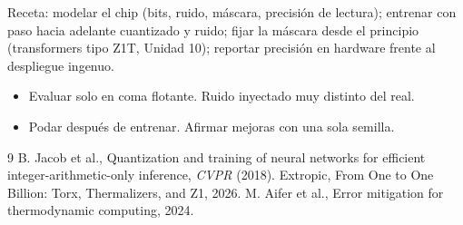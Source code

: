 \documentclass[11pt,a4paper]{article}
\begin{document}
\begin{aplicacion}
Receta: modelar el chip (bits, ruido, máscara, precisión de lectura); entrenar con paso hacia adelante cuantizado y ruido; fijar la máscara desde el principio (transformers tipo Z1T,
Unidad 10); reportar precisión en hardware frente al despliegue ingenuo.
\end{aplicacion}

\begin{error}
\begin{itemize}[nosep]
\item Evaluar solo en coma flotante. \quad Ruido inyectado muy distinto del real.
\item Podar después de entrenar. \quad Afirmar mejoras con una sola semilla.
\end{itemize}
\end{error}

\begin{thebibliography}{9}\small
{} B. Jacob et al., Quantization and training of neural networks for efficient integer-arithmetic-only inference, \emph{CVPR} (2018).
 Extropic, From One to One Billion: Torx, Thermalizers, and Z1, 2026.
 M. Aifer et al., Error mitigation for thermodynamic computing, 2024.
\end{thebibliography}
\end{document}
